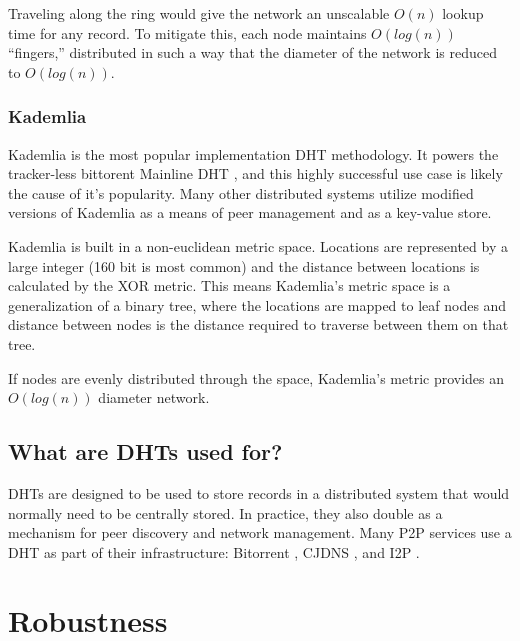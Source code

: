 	Traveling along the ring would give the network an unscalable  $O(n)$ lookup time for any record. 
	To mitigate this, each node maintains $O(log(n))$ ``fingers,'' distributed in such a way that the diameter of the network is reduced to $O(log(n))$.
	
	
	
	
	\subsubsection{Kademlia}
	
	Kademlia \cite{kademlia} is the most popular implementation DHT methodology. 
	It powers the tracker-less bittorent Mainline DHT \cite{mainline}, and this highly successful use case is likely the cause of it's popularity.
	Many other distributed systems utilize modified versions of Kademlia as a means of peer management and as a key-value store.
	
	Kademlia is built in a non-euclidean metric space. 
	Locations are represented by a large integer (160 bit is most common) and the distance between locations is calculated by the XOR metric.
	This means Kademlia's metric space is a generalization of a binary tree, where the locations are mapped to leaf nodes and distance between nodes is the distance required to traverse between them on that tree.
	
	If nodes are evenly distributed through the space, Kademlia's metric provides an $O(log(n))$ diameter network.
	
	\subsection{What are DHTs used for?}
	
	DHTs are designed to be used to store records in a distributed system that would normally need to be centrally stored.
	In practice, they also double as a mechanism for peer discovery and network management.
	Many P2P services use a DHT as part of their infrastructure: Bitorrent \cite{jimenez2011kademlia}, CJDNS \cite{hodson2013meshnet}, and I2P \cite{zantout2011i2p}.
	
	\section{Robustness}
	

